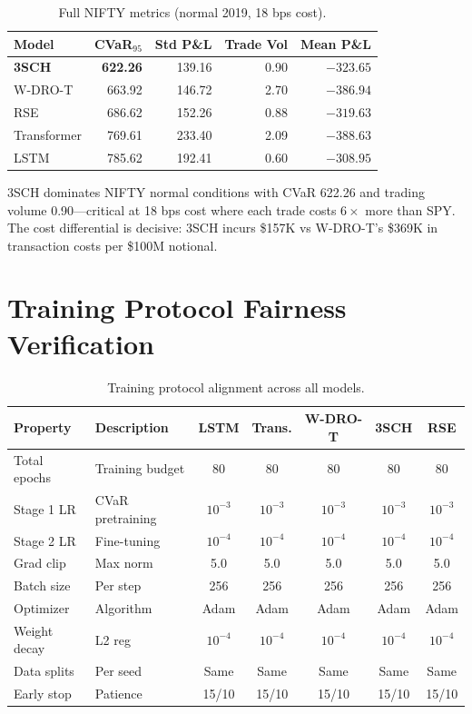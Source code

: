 \begin{table}[H]
\centering\small
\caption{Full NIFTY metrics (normal 2019, 18 bps cost).}
\begin{tabular}{@{}lrrrr@{}}
\toprule
\textbf{Model} & \textbf{CVaR$_{95}$} & \textbf{Std P\&L} & \textbf{Trade Vol} & \textbf{Mean P\&L} \\\midrule
\textbf{3SCH} & \textbf{622.26} & 139.16 & 0.90 & $-323.65$ \\
W-DRO-T & 663.92 & 146.72 & 2.70 & $-386.94$ \\
RSE & 686.62 & 152.26 & 0.88 & $-319.63$ \\
Transformer & 769.61 & 233.40 & 2.09 & $-388.63$ \\
LSTM & 785.62 & 192.41 & 0.60 & $-308.95$ \\
\bottomrule
\end{tabular}
\end{table}

3SCH dominates NIFTY normal conditions with CVaR 622.26 and trading volume 0.90---critical at 18 bps cost where each trade costs $6\times$ more than SPY. The cost differential is decisive: 3SCH incurs \$157K vs W-DRO-T's \$369K in transaction costs per \$100M notional.

\section{Training Protocol Fairness Verification}
\label{app:fairness}

\begin{table}[H]
\centering\scriptsize
\caption{Training protocol alignment across all models.}
\begin{tabularx}{\textwidth}{@{}lXccccc@{}}
\toprule
\textbf{Property} & \textbf{Description} & \textbf{LSTM} & \textbf{Trans.} & \textbf{W-DRO-T} & \textbf{3SCH} & \textbf{RSE} \\\midrule
Total epochs & Training budget & 80 & 80 & 80 & 80 & 80 \\
Stage 1 LR & CVaR pretraining & $10^{-3}$ & $10^{-3}$ & $10^{-3}$ & $10^{-3}$ & $10^{-3}$ \\
Stage 2 LR & Fine-tuning & $10^{-4}$ & $10^{-4}$ & $10^{-4}$ & $10^{-4}$ & $10^{-4}$ \\
Grad clip & Max norm & 5.0 & 5.0 & 5.0 & 5.0 & 5.0 \\
Batch size & Per step & 256 & 256 & 256 & 256 & 256 \\
Optimizer & Algorithm & Adam & Adam & Adam & Adam & Adam \\
Weight decay & L2 reg & $10^{-4}$ & $10^{-4}$ & $10^{-4}$ & $10^{-4}$ & $10^{-4}$ \\
Data splits & Per seed & Same & Same & Same & Same & Same \\
Early stop & Patience & 15/10 & 15/10 & 15/10 & 15/10 & 15/10 \\
\bottomrule
\end{tabularx}
\end{table}

